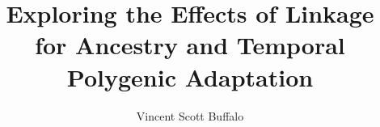 \documentclass[12pt]{ucdavisthesis}
\title          {Exploring the Effects of Linkage for Ancestry and Temporal Polygenic Adaptation}
\author         {Vincent Scott Buffalo}
\begin{document}

%

\makeintropages %






\begingroup
{}
\setlength\bibitemsep{0pt}

\nocite{kram2015}
\nocite{dplyr}
\nocite{ggplot2}
\nocite{R}
\nocite{Rossum:1995:PRM:869369}
\nocite{C}
\nocite{colorspace}
\nocite{purrr}
\nocite{tidyr}


\printbibliography
\endgroup


\end{document}
